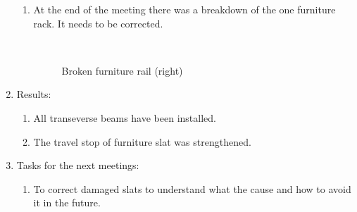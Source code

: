 \begin{enumerate}
\begin{enumerate}
      \item At the end of the meeting there was a breakdown of the one furniture rack. It needs to be corrected.
      
      \begin{figure}[H]
      	\begin{minipage}[h]{0.2\linewidth}
      		\center   
      	\end{minipage}
      	\begin{minipage}[h]{0.6\linewidth}
      		\caption{Broken furniture rail (right)}
      	\end{minipage}
      \end{figure}
      
    \end{enumerate}
    
	\item Results:
	\begin{enumerate}
	  \item All transeverse beams have been installed.
	  
      \item The travel stop of furniture slat was strengthened.
      
    \end{enumerate}
    
	\item Tasks for the next meetings:
	\begin{enumerate}
	  \item To correct damaged slats to understand what the cause and how to avoid it in the future.
	  
    \end{enumerate}     
\end{enumerate}
\fillpage
